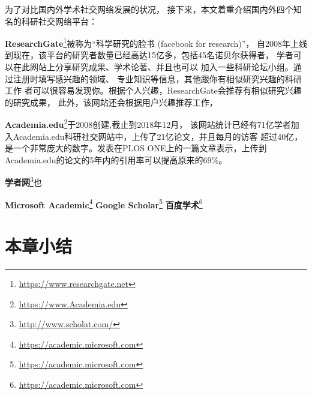 为了对比国内外学术社交网络发展的状况，
接下来，本文着重介绍国内外四个知名的科研社交网络平台：%

\textbf{ResearchGate}\footnote{\url{https://www.researchgate.net}}被称为“科学研究的脸书%
(facebook for research)”，%
自2008年上线到现在，该平台的研究者数量已经高达15亿多，包括45名诺贝尔获得者，
学者可以在此网站上分享研究成果、学术论著、并且也可以%
加入一些科研论坛小组。通过注册时填写感兴趣的领域、%
专业知识等信息，其他跟你有相似研究兴趣的科研工作%
者可以很容易发现你。根据个人兴趣，ResearchGate会推荐有相似研究兴趣的研究成果，%
此外，该网站还会根据用户兴趣推荐工作，%

\textbf{Academia.edu}\footnote{\url{https://www.Academia.edu}}于2008创建,截止到2018年12月，%
该网站统计已经有71亿学者加入Academia.edu科研社交网站中，上传了21亿论文，并且每月的访客%
超过40亿，是一个非常庞大的数字。发表在PLOS
ONE上的一篇文章表示，上传到Academia.edu的论文的5年内的引用率可以提高原来的69\%。


\textbf{学者网}\footnote{\url{http://www.scholat.com/}}也%


\textbf{Microsoft Academic}\footnote{\url{https://academic.microsoft.com}}
\textbf{Google Scholar}\footnote{\url{https://academic.microsoft.com}}
\textbf{百度学术}\footnote{\url{https://academic.microsoft.com}}

\section{本章小结}

